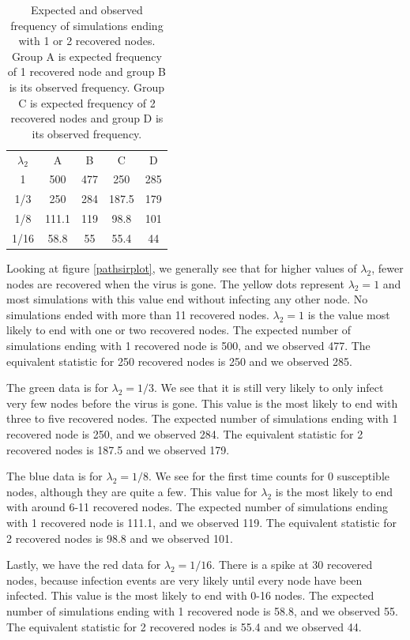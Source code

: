 \documentclass[12pt]{article} %
\numberwithin{equation}{section}
\begin{document}
\begin{table}
    \centering
   \begin{tabular}{c|c|c|c|c}
     $\lambda_2$&  A& B& C&D\\
     1& 500& 477 &250&285 \\
     1/3& 250& 284 &187.5&179 \\
     1/8& 111.1& 119 &98.8&101  \\
     1/16& 58.8& 55 &55.4&44\\
\end{tabular} 
    \label{tablepathsir}
    \caption{Expected and observed frequency of simulations ending with 1 or 2 recovered nodes. Group A is expected frequency of 1 recovered node and group B is its observed frequency. Group C is expected frequency of 2 recovered nodes and group D is its observed frequency.}
\end{table}

Looking at figure \ref{pathsirplot}, we generally see that for higher values of $\lambda_2$, fewer nodes are recovered when the virus is gone. The yellow dots represent $\lambda_2 = 1$ and most simulations with this value end without infecting any other node. No simulations ended with more than 11 recovered nodes. $\lambda_2 = 1$ is the value most likely to end with one or two recovered nodes. The expected number of simulations ending with 1 recovered node is 500, and we observed 477. The equivalent statistic for 250 recovered nodes is 250 and we observed 285.

The green data is for $\lambda_2 = 1/3$. We see that it is still very likely to only infect very few nodes before the virus is gone. This value is the most likely to end with three to five recovered nodes. The expected number of simulations ending with 1 recovered node is 250, and we observed 284. The equivalent statistic for 2 recovered nodes is 187.5 and we observed 179.

The blue data is for $\lambda_2 = 1/8$. We see for the first time counts for 0 susceptible nodes, although they are quite a few. This value for $\lambda_2$ is the most likely to end with around 6-11 recovered nodes. The expected number of simulations ending with 1 recovered node is 111.1, and we observed 119. The equivalent statistic for 2 recovered nodes is 98.8 and we observed 101.

Lastly, we have the red data for $\lambda_2 = 1/16$. There is a spike at 30 recovered nodes, because infection events are very likely until every node have been infected. This value is the most likely to end with 0-16 nodes. The expected number of simulations ending with 1 recovered node is 58.8, and we observed 55. The equivalent statistic for 2 recovered nodes is 55.4 and we observed 44.
\FloatBarrier
\end{document}
